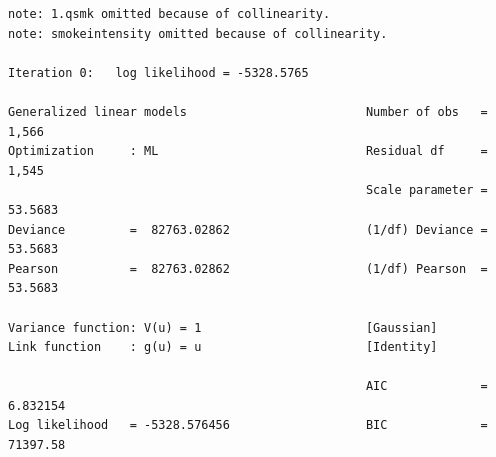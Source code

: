 \documentclass[
  10pt,
]{book}
\begin{document}
\begin{verbatim}
note: 1.qsmk omitted because of collinearity.
note: smokeintensity omitted because of collinearity.

Iteration 0:   log likelihood = -5328.5765  

Generalized linear models                         Number of obs   =      1,566
Optimization     : ML                             Residual df     =      1,545
                                                  Scale parameter =    53.5683
Deviance         =  82763.02862                   (1/df) Deviance =    53.5683
Pearson          =  82763.02862                   (1/df) Pearson  =    53.5683

Variance function: V(u) = 1                       [Gaussian]
Link function    : g(u) = u                       [Identity]

                                                  AIC             =   6.832154
Log likelihood   = -5328.576456                   BIC             =   71397.58


\end{verbatim}
\end{document}
